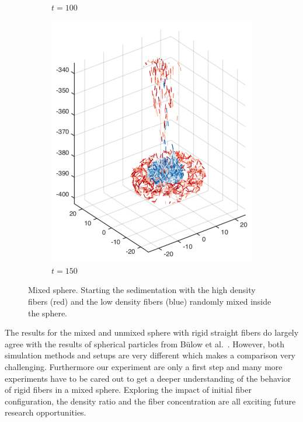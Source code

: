 \begin{figure}[!htbp]
\begin{subfigure}[h]{0.24\textwidth}
    \caption{$t=100$}\label{fig:mixing_random_c}
  \end{subfigure}
  \begin{subfigure}[h]{0.24\textwidth}
    \centering
    \includegraphics[width=\textwidth]{img/mixing/random_00150.pdf}
    \caption{$t=150$}\label{fig:mixing_random_d}
  \end{subfigure}
  \caption[Mixed sphere]{Mixed sphere. Starting the sedimentation with the high density fibers (red) and the low density fibers (blue) randomly mixed inside the sphere.}
  \label{fig:mixed_sphere}
\end{figure}

The results for the mixed and unmixed sphere with rigid straight fibers do largely agree with the results of spherical particles from Bülow et al.~\cite{Bulow2015}. However, both simulation methods and setups are very different which makes a comparison very challenging. Furthermore our experiment are only a first step and many more experiments have to be cared out to get a deeper understanding of the behavior of rigid fibers in a mixed sphere. Exploring the impact of initial fiber configuration, the density ratio and the fiber concentration are all exciting future research opportunities.
